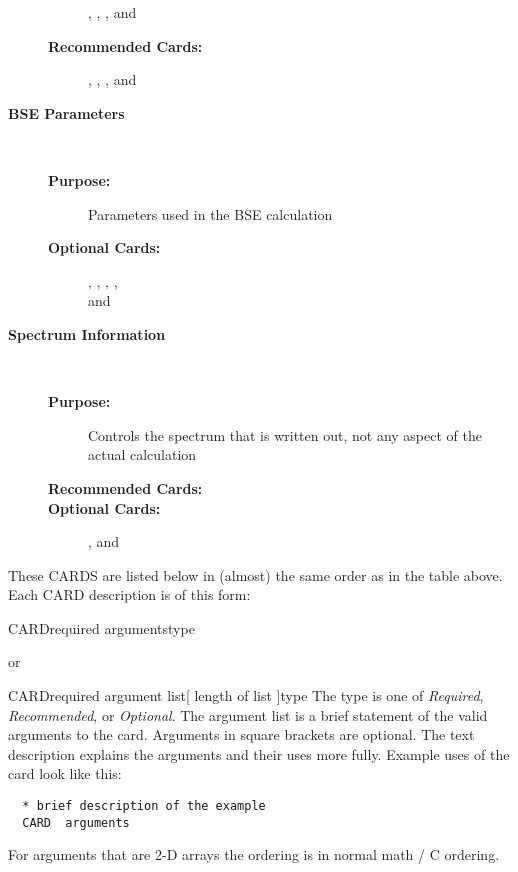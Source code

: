 \documentclass[11pt]{report}
\begin{document}
\begin{description}
\begin{description}
    ,
    ,
    ,
    and 
  \item[\textbf{Recommended Cards:}] 
     ,
     ,
     , and
  \end{description}
\item[\large\textbf{BSE Parameters}]\dotfill\
  \begin{description}
  \item[\textbf{Purpose:}] Parameters used in the BSE calculation
  \item[\textbf{Optional Cards:}]   
    ,
    ,
    ,
    , \\
    and 
  \end{description}
\item[\large\textbf{Spectrum Information}]\dotfill\
  \begin{description}
  \item[\textbf{Purpose:}] Controls the spectrum that is written out, not any aspect of the actual calculation
  \item[\textbf{Recommended Cards:}]   
    \htmlref{CNBSE.BROADEN}{card:broaden}  
   \item[\textbf{Optional Cards:}]   
    ,
    and 
  \end{description}   
\end{description}

These CARDS are listed below in (almost) the same order as in the table above.
Each CARD description is of this form:

\begin{Card}{CARD}{required arguments}{type}{}
\end{Card}
or \\
\begin{Card}{CARD}{required argument list[ length of list ]}{type}{}
  The type is one of \textsl{Required}, \textsl{Recommended}, or
  \textsl{Optional}. The argument list is a brief statement of the
  valid arguments to the card. Arguments in square brackets are 
  optional. The text description explains the arguments and 
  their uses more fully. Example uses of the card look like this:
\begin{verbatim}
  * brief description of the example
  CARD  arguments
\end{verbatim}

For arguments that are 2-D arrays the ordering is in normal math / C ordering.
\end{Card}
\end{document}
